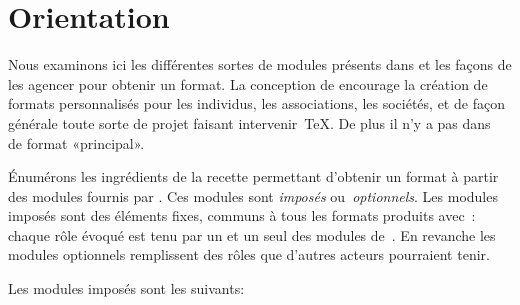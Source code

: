 

%
%
%
%


\section{Orientation}

Nous examinons ici les différentes sortes de modules présents dans
{\brTeX} et les façons de les agencer pour obtenir un format. La
conception de {\brTeX} encourage la création de formats personnalisés
pour les individus, les associations, les sociétés, et de façon
générale toute sorte de projet faisant intervenir~{\TeX}. De plus il n'y
a pas dans~{\brTeX} de format «principal».

Énumérons les ingrédients de la recette permettant d'obtenir un format à
partir des modules fournis par {\brTeX}.  Ces modules sont
\emph{imposés} ou~\emph{optionnels}.
Les modules imposés sont des éléments fixes, communs à
tous les formats produits avec~{\brTeX}: chaque rôle évoqué est tenu par
un et un seul des modules de~{\brTeX}.   En revanche les modules
optionnels remplissent des rôles que d'autres acteurs pourraient
tenir.

Les modules imposés sont les suivants:

